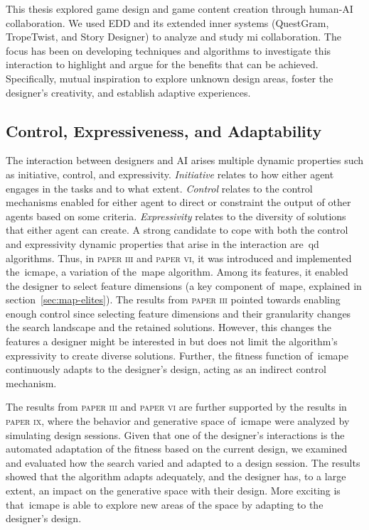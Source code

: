 This thesis explored game design and game content creation through human-AI collaboration. We used EDD and its extended inner systems (QuestGram, TropeTwist, and Story Designer) to analyze and study \acrshort{mi} collaboration. The focus has been on developing techniques and algorithms to investigate this interaction to highlight and argue for the benefits that can be achieved. Specifically, mutual inspiration to explore unknown design areas, foster the designer's creativity, and establish adaptive experiences.

\subsection{Control, Expressiveness, and Adaptability}

The interaction between designers and AI arises multiple dynamic properties such as initiative, control, and expressivity. \emph{Initiative} relates to how either agent engages in the tasks and to what extent. \emph{Control} relates to the control mechanisms enabled for either agent to direct or constraint the output of other agents based on some criteria. \emph{Expressivity} relates to the diversity of solutions that either agent can create. A strong candidate to cope with both the control and expressivity dynamic properties that arise in the interaction are~\acrshort{qd} algorithms. Thus, in \textsc{paper iii} and \textsc{paper vi}, it was introduced and implemented the~\acrlong{icmape}, a variation of the~\acrshort{mape} algorithm. Among its features, it enabled the designer to select feature dimensions (a key component of~\acrshort{mape}, explained in section~\ref{sec:map-elites}). The results from \textsc{paper iii} pointed towards enabling enough control since selecting feature dimensions and their granularity changes the search landscape and the retained solutions. However, this changes the features a designer might be interested in but does not limit the algorithm's expressivity to create diverse solutions. Further, the fitness function of~\acrshort{icmape} continuously adapts to the designer's design, acting as an indirect control mechanism.

The results from \textsc{paper iii} and \textsc{paper vi} are further supported by the results in \textsc{paper ix}, where the behavior and generative space of~\acrshort{icmape} were analyzed by simulating design sessions. Given that one of the designer's interactions is the automated adaptation of the fitness based on the current design, we examined and evaluated how the search varied and adapted to a design session. The results showed that the algorithm adapts adequately, and the designer has, to a large extent, an impact on the generative space with their design. More exciting is that~\acrshort{icmape} is able to explore new areas of the space by adapting to the designer's design.

